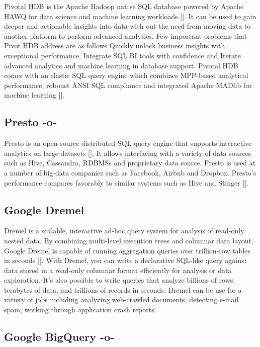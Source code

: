 Pivotal HDB is the Apache Hadoop native SQL database powered by Apache
HAWQ for data science and machine learning workloads
[\cite{www-apache-hqwq}]. It can be used to gain deeper and actionable
insights into data with out the need from moving data to another
platform to perform advanced analytics. Few important problems that
Pivot HDB address are as follows Quickly unlock business insights with
exceptional performance, Integrate SQL BI tools with confidence and
Iterate advanced analytics and machine learning in database
support. Pivotal HDB comes with an elastic SQL query engine which
combines MPP-based analytical performance, roboust ANSI SQL compliance
and integrated Apache MADlib for machine learning
[\cite{www-pivotalhdb}].


     
\subsection{Presto -o-}

Presto is an open-source distributed SQL query engine that supports
interactive analytics on large datasets [\cite{www-presto}]. It allows
interfacing with a variety of data sources such as Hive, Cassandra,
RDBMSs and proprietary data source. Presto is used at a number of
big-data companies such as Facebook, Airbnb and Dropbox. Presto's
performance compares favorably to similar systems such as Hive and
Stinger [\cite{presto-paper-2014}].



\subsection{Google Dremel}
 
Dremel is a scalable, interactive ad-hoc query system for analysis of
read-only nested data. By combining multi-level execution trees and
columnar data layout, Google Dremel is capable of running aggregation
queries over trillion-row tables in seconds [\cite{paper-dremel}]. With
Dremel, you can write a declarative SQL-like query against data stored
in a read-only columnar format efficiently for analysis or data
exploration.  It's also possible to write queries that analyze
billions of rows, terabytes of data, and trillions of records in
seconds. Dremel can be use for a variety of jobs including analyzing
web-crawled documents, detecting e-mail spam, working through
application crash reports.

\subsection{Google BigQuery -o-}



